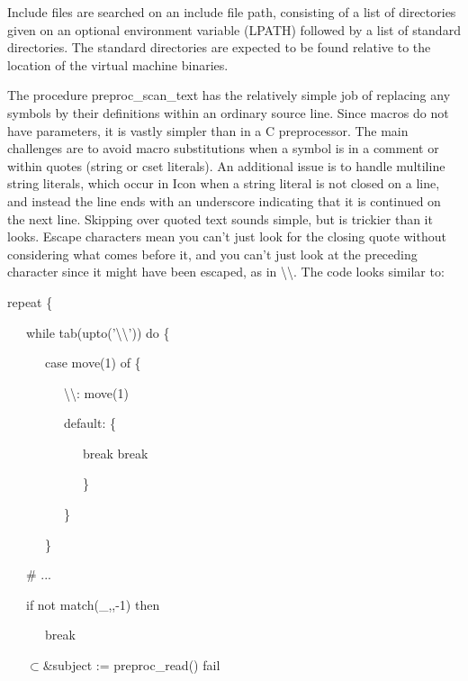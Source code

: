 Include files are searched on an include file path, consisting of a
list of directories given on an optional environment variable (LPATH)
followed by a list of standard directories. The standard directories
are expected to be found relative to the location of the virtual
machine binaries.

The procedure preproc\_scan\_text has the relatively simple job of
replacing any symbols by their definitions within an ordinary source
line. Since macros do not have parameters, it is vastly simpler than
in a C preprocessor. The main challenges are to avoid macro
substitutions when a symbol is in a comment or within quotes (string
or cset literals).  An additional issue is to handle multiline string
literals, which occur in Icon when a string literal is not closed on a
line, and instead the line ends with an underscore indicating that it
is continued on the next line. Skipping over quoted text sounds
simple, but is trickier than it looks. Escape characters mean you
can't just look for the closing quote without considering what comes
before it, and you can't just look at the preceding character since it
might have been escaped, as in
{\textquotedbl}{\textbackslash}{\textbackslash}{\textquotedbl}. The
code looks similar to:

{\ttfamily\mdseries
repeat \{}

{\ttfamily\mdseries
\ \ \ while tab(upto('{\textquotedbl}{\textbackslash}{\textbackslash}')) do \{}

{\ttfamily\mdseries
\ \ \ \ \ \ case move(1) of \{}

{\ttfamily\mdseries
\ \ \ \ \ \ \ \ \ {\textquotedbl}{\textbackslash}{\textbackslash}{\textquotedbl}: move(1)}

{\ttfamily\mdseries
\ \ \ \ \ \ \ \ \ default: \{}

{\ttfamily\mdseries
\ \ \ \ \ \ \ \ \ \ \ \ break break}

{\ttfamily\mdseries
\ \ \ \ \ \ \ \ \ \ \ \ \}}

{\ttfamily\mdseries
\ \ \ \ \ \ \ \ \ \}}

{\ttfamily\mdseries
\ \ \ \ \ \ \}}

{\ttfamily\mdseries
\ \ \ \# ...}

{\ttfamily\mdseries
\ \ \ if not match({\textquotedbl}\_{\textquotedbl},,-1) then}

{\ttfamily\mdseries
\ \ \ \ \ \ break}

{\ttfamily\mdseries
\ \ \ ${\subset}$\&subject := preproc\_read() {\textbar} fail}

